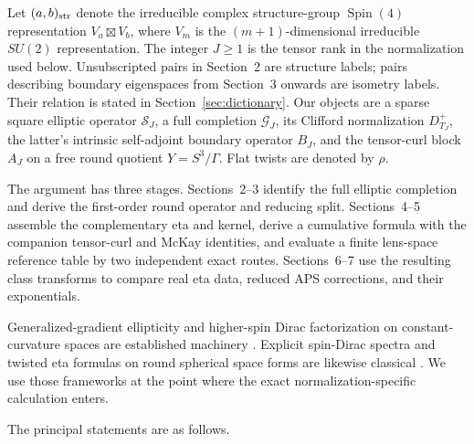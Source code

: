 \documentclass[11pt]{article}
\theoremstyle{definition}
\newcommand{\Spin}{\operatorname{Spin}}
\begin{document}
Let $(a,b)_{\rm str}$ denote the irreducible complex structure-group
$\Spin(4)$ representation
$V_a\boxtimes V_b$, where $V_m$ is the $(m+1)$-dimensional irreducible
$SU(2)$ representation.  The integer $J\geq 1$ is the tensor rank in the
normalization used below. Unsubscripted pairs in Section~2 are structure
labels; pairs describing boundary eigenspaces from Section~3 onwards are
isometry labels. Their relation is stated in Section~\ref{sec:dictionary}.
Our objects are a sparse square elliptic operator $\mathcal S_J$, a full
completion $\mathcal G_J$, its Clifford normalization $D^+_{T_J}$, the
latter's intrinsic self-adjoint boundary operator $B_J$,
and the tensor-curl block $A_J$ on a free round quotient
$Y=S^3/\Gamma$.  Flat twists are denoted by $\rho$.

The argument has three stages. Sections~2--3 identify the full elliptic
completion and derive the first-order round operator and reducing split.
Sections~4--5 assemble the complementary eta
and kernel, derive a cumulative formula with the companion tensor-curl and
McKay identities, and evaluate a finite lens-space reference table by two
independent exact routes.  Sections~6--7 use the resulting class transforms to
compare real eta data, reduced APS corrections, and their exponentials.

Generalized-gradient ellipticity and higher-spin Dirac factorization on
constant-curvature spaces are established machinery
\cite[arXiv v1, p.~1 and Thms.~3.12--3.13]{Pilca2011}
\cite[Prop.~1 and Thms.~5, 7, 10]{HommaTomihisa2021}.  Explicit spin-Dirac
spectra and twisted eta formulas on round spherical space forms are likewise
classical
\cite[Thms.~1--2]{Bar1996}
\cite[Thm.~4.3]{BoldtLauret2017}
\cite[Lemmas~2.1--2.2 and Thm.~2.5]{Gilkey1984}
\cite{CisnerosMolina2001,CacicMarcolliTeh2014}.  We use those frameworks at
the point where the exact normalization-specific calculation enters.

The principal statements are as follows.
\end{document}
